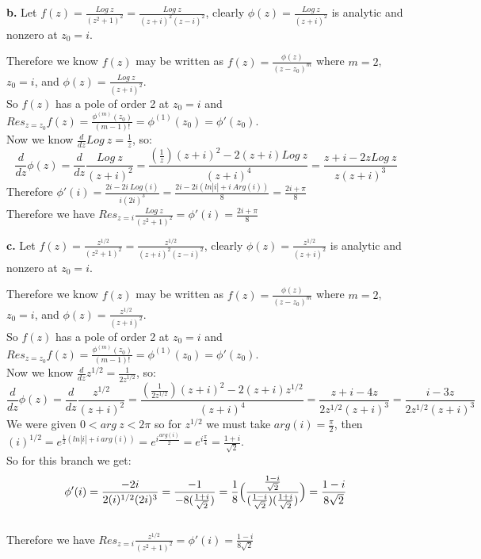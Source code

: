 \documentclass{article}
\begin{document}
{\Large\textbf{b.}} Let $f(z) =\frac{Log\:z}{(z^2 + 1)^2} =\frac{Log\:z}{(z + i)^2 (z - i)^2}$, clearly $\phi (z) =\frac{Log\:z}{(z+i)^2}$ is analytic and nonzero at $z_0 = i$.
\begin{center}
    \doublespacing
    Therefore we know $f(z)$ may be written as $f(z) =\frac{\phi (z)}{(z - z_0)^m}$ where $m = 2$, $z_0 = i$, and $\phi (z) =\frac{Log\:z}{(z+i)^2}$.
    \\So $f(z)$ has a pole of order 2 at $z_0 = i$ and $Res_{z=z_0} f(z) =\frac{\phi ^{(m)} (z_0)}{(m-1)!} =\phi ^{(1)} (z_0) =\phi '(z_0)$.
    \\Now we know $\frac{d}{dz} Log\:z =\frac{1}{z}$, so:
    \[\frac{d}{dz} \phi (z) =\frac{d}{dz}\frac{Log\:z}{(z+i)^2} =\frac{(\frac{1}{z})(z+i)^2 -2(z+i)Log\:z}{(z+i)^4} =\frac{z+i - 2z Log\:z}{z(z+i)^3}\]
    Therefore $\phi '(i) =\frac{2i -2i\:Log(i)}{i(2i)^3} =\frac{2i - 2i(ln|i| + i\:Arg(i))}{8} =\frac{2i +\pi}{8}$
    \\Therefore we have $Res_{z=i}\frac{Log\:z}{(z^2 + 1)^2} = \phi '(i) =\frac{2i +\pi}{8}$ \qedsymbol
\end{center}

{\Large\textbf{c.}} Let $f(z) =\frac{z^{1/2}}{(z^2 + 1)^2} =\frac{z^{1/2}}{(z+i)^2 (z-i)^2}$, clearly $\phi (z) =\frac{z^{1/2}}{(z+i)^2}$ is analytic and nonzero at $z_0 = i$.
\begin{center}
    \doublespacing
    Therefore we know $f(z)$ may be written as $f(z) =\frac{\phi (z)}{(z - z_0)^m}$ where $m = 2$, $z_0 = i$, and $\phi (z) =\frac{z^{1/2}}{(z+i)^2}$.
    \\So $f(z)$ has a pole of order 2 at $z_0 = i$ and $Res_{z=z_0} f(z) =\frac{\phi ^{(m)} (z_0)}{(m-1)!} =\phi ^{(1)} (z_0) =\phi '(z_0)$.
    \\Now we know $\frac{d}{dz} z^{1/2} =\frac{1}{2z^{1/2}}$, so:
    \[\frac{d}{dz} \phi (z) =\frac{d}{dz}\frac{z^{1/2}}{(z+i)^2} =\frac{(\frac{1}{2z^{1/2}})(z+i)^2 -2(z+i)z^{1/2}}{(z+i)^4} =\frac{z+i - 4z}{2z^{1/2}(z+i)^3} =\frac{i - 3z}{2z^{1/2}(z+i)^3}\]
    We were given $0 < arg\:z < 2\pi$ so for $z^{1/2}$ we must take $arg(i) =\frac{\pi}{2}$, then $(i)^{1/2} = e^{\frac{1}{2}(ln|i| + i\:arg(i))} = e^{i\frac{arg(i)}{2}} = e^{i\frac{\pi}{4}} =\frac{1 + i}{\sqrt{2}}$.
    \\So for this branch we get:
    \[\phi '(i) =\frac{-2i}{2(i)^{1/2}(2i)^3} =\frac{-1}{-8(\frac{1 + i}{\sqrt{2}})} =\frac{1}{8}\Big{(}\frac{\frac{1 - i}{\sqrt{2}}}{(\frac{1 - i}{\sqrt{2}})(\frac{1 + i}{\sqrt{2}})}\Big{)} =\frac{1 - i}{8\sqrt{2}}\]
    \\Therefore we have $Res_{z=i}\frac{z^{1/2}}{(z^2 + 1)^2} =\phi '(i) =\frac{1 - i}{8\sqrt{2}}$ \qedsymbol
\end{center}
\end{document}
